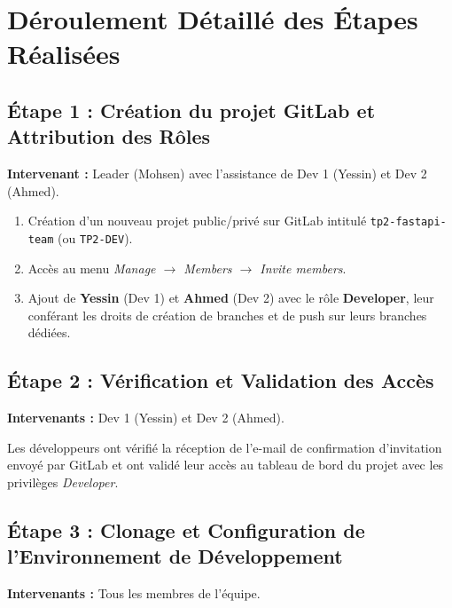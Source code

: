 \documentclass[a4paper,12pt]{article}
\begin{document}
\section{Déroulement Détaillé des Étapes Réalisées}

\subsection{Étape 1 : Création du projet GitLab et Attribution des Rôles}
\textbf{Intervenant :} Leader (Mohsen) avec l'assistance de Dev 1 (Yessin) et Dev 2 (Ahmed).

\begin{enumerate}
    \item Création d'un nouveau projet public/privé sur GitLab intitulé \texttt{tp2-fastapi-team} (ou \texttt{TP2-DEV}).
    \item Accès au menu \textit{Manage $\rightarrow$ Members $\rightarrow$ Invite members}.
    \item Ajout de \textbf{Yessin} (Dev 1) et \textbf{Ahmed} (Dev 2) avec le rôle \textbf{Developer}, leur conférant les droits de création de branches et de push sur leurs branches dédiées.
\end{enumerate}

\subsection{Étape 2 : Vérification et Validation des Accès}
\textbf{Intervenants :} Dev 1 (Yessin) et Dev 2 (Ahmed).

Les développeurs ont vérifié la réception de l'e-mail de confirmation d'invitation envoyé par GitLab et ont validé leur accès au tableau de bord du projet avec les privilèges \textit{Developer}.

\subsection{Étape 3 : Clonage et Configuration de l'Environnement de Développement}
\textbf{Intervenants :} Tous les membres de l'équipe.
\end{document}
